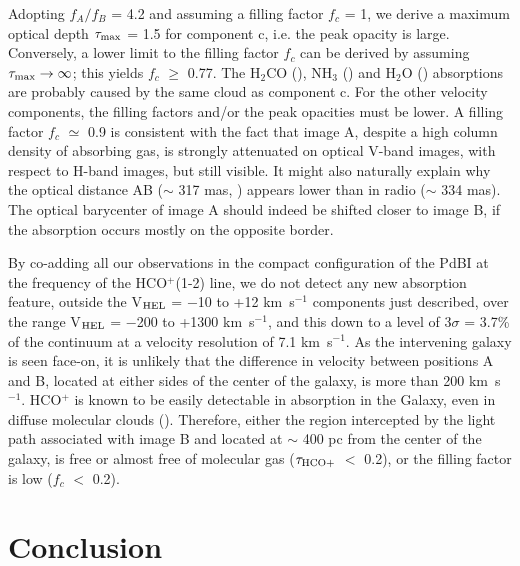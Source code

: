 \documentclass[oldversion]{aa}
\begin{document}
Adopting $f_A/f_B$ = 4.2 and assuming a filling factor $f_c$ = 1, we derive a maximum
optical depth $\tau _{\rm max}$ = 1.5 for component c,
i.e. the peak opacity is large. Conversely, a lower limit to the filling factor $f_c$ can
be derived by assuming $\tau _{\rm max} \rightarrow \infty$; this yields $f_c$ $\geq$ 0.77. The H$_2$CO
(\citealt{men96}), NH$_3$ (\citealt{hen05}) and H$_2$O (\citealt{com97}) absorptions are probably
caused by the same cloud as component c. For the other velocity components, the filling
factors and/or the peak opacities must be lower. A filling factor $f_c$ $\simeq$ 0.9 is
consistent with the fact that image A, despite a high column density of absorbing gas, is
strongly attenuated on optical V-band images, with respect to H-band images, but still
visible. It might also naturally explain why the optical distance AB ($\sim$ 317 mas,
\citealt{yor05}) appears lower than in radio ($\sim$ 334 mas). The optical barycenter of
image A should indeed be shifted closer to image B, if the absorption occurs mostly on the
opposite border.

By co-adding all our observations in the compact configuration
of the PdBI at the frequency of the HCO$^+$(1-2) line,
we do not detect any new absorption
feature, outside the V$_{\rm HEL}$ = $-$10 to +12 km~s$^{-1}$ components just described, over
the range V$_{\rm HEL}$ = $-$200 to +1300 km~s$^{-1}$, and this down to a level of 3$\sigma$
= 3.7\% of the continuum at a velocity resolution of 7.1 km~s$^{-1}$. 
As the intervening galaxy is seen face-on, it is unlikely that the
difference in velocity between positions A and B, located at either sides of the center of
the galaxy, is more than 200 km~s$^{-1}$. HCO$^+$ is known to be easily detectable in
absorption in the Galaxy, even in diffuse molecular clouds (\citealt{luc96}).
Therefore, either the region intercepted by the light path associated with image B and
located at $\sim$ 400 pc from the center of the galaxy, is free or almost free of molecular
gas ($\tau_{\rm HCO+}$ $<$ 0.2), or the filling factor is low ($f_c$ $<$ 0.2).


\section{Conclusion}
\end{document}
